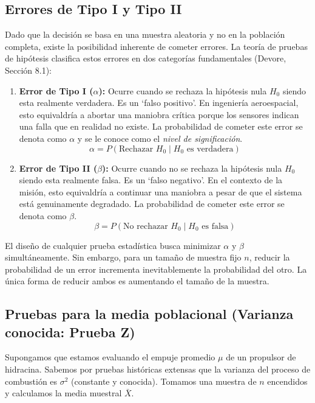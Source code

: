 \subsection{Errores de Tipo I y Tipo II}

Dado que la decisión se basa en una muestra aleatoria y no en la población completa, existe la posibilidad inherente de cometer errores. La teoría de pruebas de hipótesis clasifica estos errores en dos categorías fundamentales (Devore, Sección 8.1):

\begin{enumerate}
    \item \textbf{Error de Tipo I ($\alpha$):} Ocurre cuando se rechaza la hipótesis nula $H_0$ siendo esta realmente verdadera. Es un `falso positivo'. En ingeniería aeroespacial, esto equivaldría a abortar una maniobra crítica porque los sensores indican una falla que en realidad no existe. La probabilidad de cometer este error se denota como $\alpha$ y se le conoce como el \textit{nivel de significación}.
    $$ \alpha = P(\text{Rechazar } H_0 \mid H_0 \text{ es verdadera}) $$
    \item \textbf{Error de Tipo II ($\beta$):} Ocurre cuando no se rechaza la hipótesis nula $H_0$ siendo esta realmente falsa. Es un `falso negativo'. En el contexto de la misión, esto equivaldría a continuar una maniobra a pesar de que el sistema está genuinamente degradado. La probabilidad de cometer este error se denota como $\beta$.
    $$ \beta = P(\text{No rechazar } H_0 \mid H_0 \text{ es falsa}) $$
\end{enumerate}

El diseño de cualquier prueba estadística busca minimizar $\alpha$ y $\beta$ simultáneamente. Sin embargo, para un tamaño de muestra fijo $n$, reducir la probabilidad de un error incrementa inevitablemente la probabilidad del otro. La única forma de reducir ambos es aumentando el tamaño de la muestra.

\subsection{Pruebas para la media poblacional (Varianza conocida: Prueba Z)}

Supongamos que estamos evaluando el empuje promedio $\mu$ de un propulsor de hidracina. Sabemos por pruebas históricas extensas que la varianza del proceso de combustión es $\sigma^2$ (constante y conocida). Tomamos una muestra de $n$ encendidos y calculamos la media muestral $\bar{X}$. 

